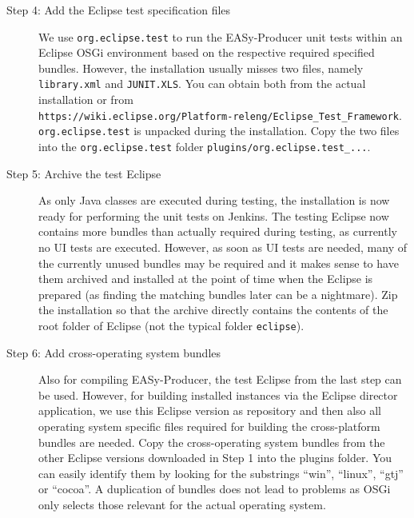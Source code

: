 \begin{description}
	\item[Step 4: Add the Eclipse test specification files] $ $\\
	
We use \texttt{org.eclipse.test} to run the EASy-Producer unit tests within an Eclipse OSGi environment based on the respective required specified bundles. However, the installation usually misses two files, namely \texttt{library.xml} and \texttt{JUNIT.XLS}. You can obtain both from the actual installation or from\\
\texttt{https://wiki.eclipse.org/Platform-releng/Eclipse\_Test\_Framework}.\\
\texttt{org.eclipse.test} is unpacked during the installation. Copy the two files into the \texttt{org.eclipse.test} folder \texttt{plugins/org.eclipse.test\_...}. 

	\item[Step 5: Archive the test Eclipse] $ $\\

As only Java classes are executed during testing, the installation is now ready for performing the unit tests on Jenkins. The testing Eclipse now contains more bundles than actually required during testing, as currently no UI tests are executed. However, as soon as UI tests are needed, many of the currently unused bundles may be required and it makes sense to have them archived and installed at the point of time when the Eclipse is prepared (as finding the matching bundles later can be a nightmare). Zip the installation so that the archive directly contains the contents of the root folder of Eclipse (not the typical folder \texttt{eclipse}).	

	\item[Step 6: Add cross-operating system bundles] $ $\\
	
Also for compiling EASy-Producer, the test Eclipse from the last step can be used. However, for building installed instances via the Eclipse director application, we use this Eclipse version as repository and then also all operating system specific files required for building the cross-platform bundles are needed. Copy the cross-operating system bundles from the other Eclipse versions downloaded in Step 1 into the plugins folder. You can easily identify them by looking for the substrings ``win'', ``linux'', ``gtj'' or ``cocoa''. A duplication of bundles does not lead to problems as OSGi only selects those relevant for the actual operating system. 


\end{description}
